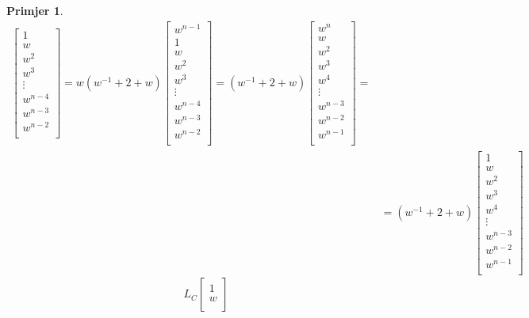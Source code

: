 \documentclass[11pt]{article}
\newtheorem{example}{Primjer}
\begin{document}
\begin{example}
\[\begin{split}
\begin{bmatrix}
		1        \\
		w        \\
		w^2      \\
		w^3      \\
		\vdots   \\
		w^{n-4}  \\
		w^{n-3}  \\
		w^{n-2}  \\
		\end{bmatrix}
		= 
		w (w^{-1} + 2 + w)
		\begin{bmatrix}
		w^{n-1}  \\
		1        \\
		w        \\
		w^2      \\
		w^3      \\
		\vdots   \\
		w^{n-4}  \\
		w^{n-3}  \\
		w^{n-2}  \\
		\end{bmatrix}
		= 
		(w^{-1} + 2 + w)
		\begin{bmatrix}
		w^n      \\
		w        \\
		w^2      \\
		w^3      \\
		w^4      \\
		\vdots   \\
		w^{n-3}  \\
		w^{n-2}  \\
		w^{n-1}  \\
		\end{bmatrix} = \\
		& = 
		(w^{-1} + 2 + w)
		\begin{bmatrix}
		1      \\
		w        \\
		w^2      \\
		w^3      \\
		w^4      \\
		\vdots   \\
		w^{n-3}  \\
		w^{n-2}  \\
		w^{n-1}  \\
		\end{bmatrix}
	\end{split}
	\]
	\[
	 L_C 
	 \begin{bmatrix}
		1      \\
		w        \\

\end{bmatrix}\]
\end{example}
\end{document}
